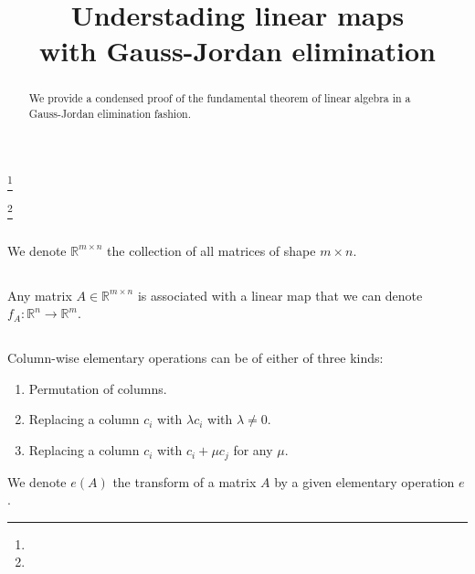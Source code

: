 \documentclass{proc-l}
\theoremstyle{definition}
\theoremstyle{remark}
\numberwithin{equation}{section}
\newcommand{\R}{\mathbb{R}}
\newcommand{\x}{\times}
\begin{document}
\title{Understading linear maps\\ with Gauss-Jordan elimination}


\address{}
\curraddr{}
\email{}
\thanks{}

\address{}
\curraddr{}
\email{}
\thanks{}





\begin{abstract}
We provide a condensed proof of the fundamental theorem of linear algebra in a Gauss-Jordan elimination fashion.
\end{abstract}

\maketitle

\subsection{}
We denote $\R^{m \x n}$ the collection of all matrices of shape $m\x n$.

\subsection{}
Any matrix $A\in\R^{m\times n}$ is associated with a linear map that we can denote $f_A:\R^n\to\R^m$. 

\subsection{}
Column-wise elementary operations can be of either of three kinds:
\begin{enumerate}
\item Permutation of columns.
\item Replacing a column $c_i$ with $\lambda c_i$ with $\lambda\neq 0$.
\item Replacing a column $c_i$ with $c_i + \mu c_j$ for any $\mu$.
\end{enumerate}
We denote $e(A)$ the transform of a matrix $A$ by a given elementary operation $e$.
\end{document}
